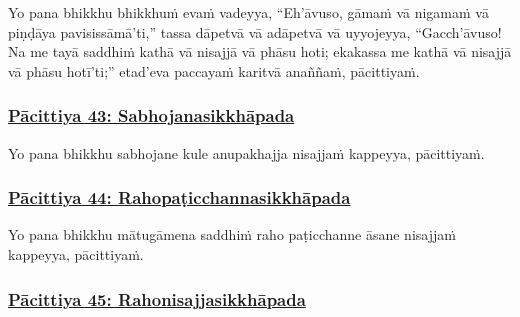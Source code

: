 Yo pana bhikkhu bhikkhuṁ evaṁ vadeyya,\makeatletter\hyperlink{endnote311-appendix}\makeatother{} ``Eh'āvuso, gāmaṁ vā nigamaṁ vā piṇḍāya pavisissāmā'ti,''\makeatletter\hyperlink{endnote312-appendix}\makeatother{} tassa dāpetvā vā adāpetvā vā uyyojeyya, ``Gacch'āvuso! Na me tayā saddhiṁ kathā vā nisajjā vā phāsu hoti; ekakassa\makeatletter\hyperlink{endnote313-appendix}\makeatother{} me kathā vā nisajjā vā phāsu hotī'ti;'' etad'eva paccayaṁ karitvā anaññaṁ, pācittiyaṁ.



\subsubsection*{\hyperref[exp43]{Pācittiya 43: Sabhojanasikkhāpada}}
\label{pac43}

Yo pana bhikkhu sabhojane kule anupakhajja\makeatletter\hyperlink{endnote314-appendix}\makeatother{} nisajjaṁ kappeyya, pācittiyaṁ.



\subsubsection*{\hyperref[exp44]{Pācittiya 44: Rahopaṭicchannasikkhāpada}}
\label{pac44}

Yo pana bhikkhu mātugāmena saddhiṁ raho paṭicchanne āsane nisajjaṁ kappeyya, pācittiyaṁ.



\subsubsection*{\hyperref[exp45]{Pācittiya 45: Rahonisajjasikkhāpada}}
\label{pac45}

